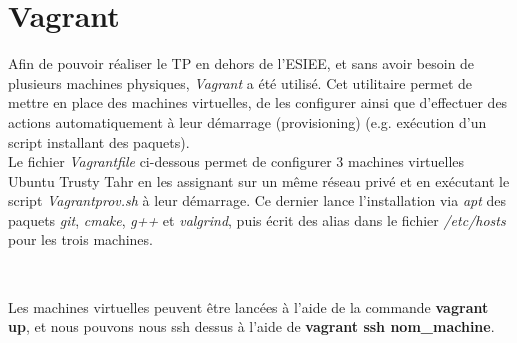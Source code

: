 \section{Vagrant}
Afin de pouvoir réaliser le TP en dehors de l'ESIEE, et sans avoir besoin de plusieurs machines physiques, \emph{Vagrant} \cite{cite:vagrant} a été utilisé. Cet utilitaire permet de mettre en place des machines virtuelles, de les configurer ainsi que d'effectuer des actions automatiquement à leur démarrage (provisioning) (e.g. exécution d'un script installant des paquets).\\

Le fichier \emph{Vagrantfile} ci-dessous permet de configurer 3 machines virtuelles Ubuntu Trusty Tahr en les assignant sur un même réseau privé et en exécutant le script \emph{Vagrantprov.sh} à leur démarrage. Ce dernier lance l'installation via \emph{apt} des paquets \emph{git}, \emph{cmake}, \emph{g++} et \emph{valgrind}, puis écrit des alias dans le fichier \emph{/etc/hosts} pour les trois machines.




\

Les machines virtuelles peuvent être lancées à l'aide de la commande \textbf{vagrant up}, et nous pouvons nous ssh dessus à l'aide de \textbf{vagrant ssh nom\_machine}.
